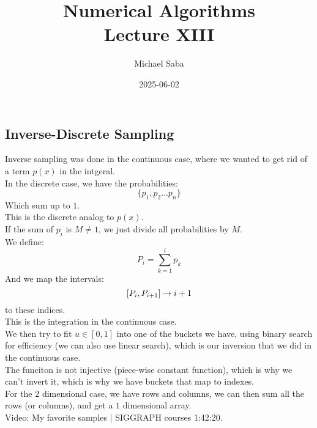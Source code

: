 \documentclass[12pt]{article}
\title{%
    \Huge Numerical Algorithms \\
    \Large Lecture XIII
}
\date{2025-06-02}
\author{Michael Saba}
\begin{document}
\maketitle
\newpage
\setlength{\parindent}{0pt}

\subsection*{Inverse-Discrete Sampling}

Inverse sampling was done in the continuous case,
where we wanted to get rid of a term $p(x)$
in the intgeral. \\

In the discrete case, we have the probabilities:
\[ \{p_1, p_2 \dots p_n \} \]
Which sum up to $1$. \\
This is the discrete analog to $p(x)$. \\

If the sum of $p_i$ is $M \neq 1$, we just divide
all probabilities by $M$. \\

We define:
\[ P_i = \sum_{k=1}^i p_k \]
And we map the intervals:
\[ \left[  P_i,  P_{i+1} \right] \to i+1 \]
to these indices. \\
This is the integration in the continuous case. \\

We then try to fit $u \in [0, 1]$ 
into one of the buckets we have,
using binary search for efficiency
(we can also use linear search), which is our
inversion that we did in the continuous case. \\

The funciton is not injective (piece-wise constant function), 
which is why we can't
invert it, which is why we have buckets that map to
indexes. \\

For the $2$ dimensional case, we have rows and columns,
we can then sum all the rows (or columns),
and get a $1$ dimensional array. \\

Video: My favorite samples | SIGGRAPH courses 1:42:20. \\

\newpage
\end{document}

